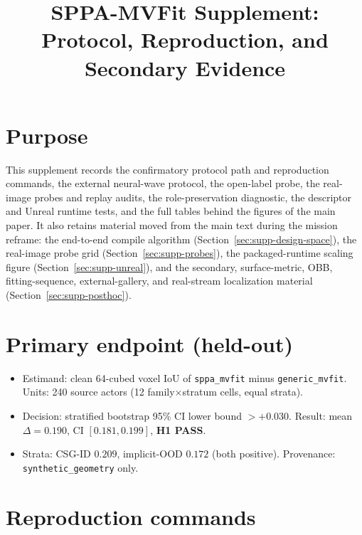 \documentclass[10pt]{article}
\title{SPPA-MVFit Supplement: Protocol, Reproduction, and Secondary Evidence}
\author{}
\date{}
\begin{document}
\maketitle
\vspace{-2.2em}

\renewcommand{\thesection}{S.\arabic{section}}
\renewcommand{\thetable}{S\arabic{table}}
\renewcommand{\thefigure}{S\arabic{figure}}
\setcounter{section}{0}
\setcounter{table}{0}
\setcounter{figure}{0}

\section*{Purpose}

This supplement records the confirmatory protocol path and reproduction
commands, the external neural-wave protocol, the open-label probe, the
real-image probes and replay audits, the role-preservation diagnostic, the
descriptor and Unreal runtime tests, and the full tables behind the figures
of the main paper. It also retains material moved from the main text during
the mission reframe: the end-to-end
compile algorithm (Section~\ref{sec:supp-design-space}), the real-image probe
grid (Section~\ref{sec:supp-probes}), the packaged-runtime scaling figure
(Section~\ref{sec:supp-unreal}), and the secondary, surface-metric, OBB,
fitting-sequence, external-gallery, and real-stream localization material
(Section~\ref{sec:supp-posthoc}).

\section*{Primary endpoint (held-out)}

\begin{itemize}
\item Estimand: clean 64-cubed voxel IoU of \texttt{sppa\_mvfit} minus
\texttt{generic\_mvfit}. Units: 240 source actors (12
family\(\times\)stratum cells, equal strata).
\item Decision: stratified bootstrap 95\% CI lower bound \(> +0.030\).
Result: mean \(\Delta=0.190\), CI \([0.181,0.199]\), \textbf{H1 PASS}.
\item Strata: CSG-ID \(0.209\), implicit-OOD \(0.172\) (both positive).
Provenance: \texttt{synthetic\_geometry} only.
\end{itemize}

\section*{Reproduction commands}
\end{document}
